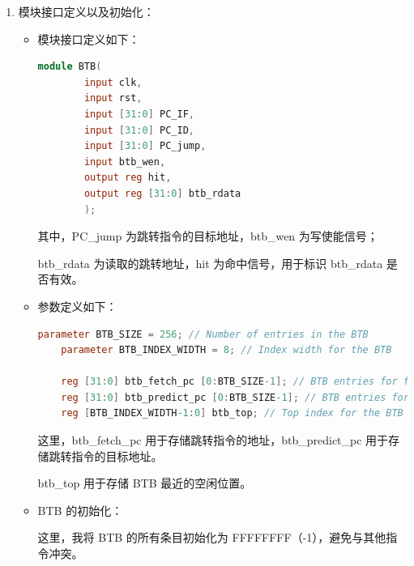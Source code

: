 \documentclass{article}
\begin{document}
\begin{enumerate}
    \item 模块接口定义以及初始化：\par
    \begin{itemize}
        \item 模块接口定义如下：\par
        \begin{lstlisting}[language=Verilog]
    module BTB(
        input clk,
        input rst,
        input [31:0] PC_IF,
        input [31:0] PC_ID,
        input [31:0] PC_jump,
        input btb_wen,
        output reg hit,
        output reg [31:0] btb_rdata
        );
        \end{lstlisting}
        其中，PC\_jump 为跳转指令的目标地址，btb\_wen 为写使能信号；\par
        btb\_rdata 为读取的跳转地址，hit 为命中信号，用于标识 btb\_rdata 是否有效。\par

        \item 参数定义如下：\par
        \begin{lstlisting}[language=Verilog]
    parameter BTB_SIZE = 256; // Number of entries in the BTB
    parameter BTB_INDEX_WIDTH = 8; // Index width for the BTB

    reg [31:0] btb_fetch_pc [0:BTB_SIZE-1]; // BTB entries for fetched PC
    reg [31:0] btb_predict_pc [0:BTB_SIZE-1]; // BTB entries for predicted PC
    reg [BTB_INDEX_WIDTH-1:0] btb_top; // Top index for the BTB
        \end{lstlisting}
        这里，btb\_fetch\_pc 用于存储跳转指令的地址，btb\_predict\_pc 用于存储跳转指令的目标地址。\par
        btb\_top 用于存储 BTB 最近的空闲位置。\par

        \item BTB 的初始化：\par
        这里，我将 BTB 的所有条目初始化为 FFFFFFFF（-1），避免与其他指令冲突。\par

    \end{itemize}


\end{enumerate}
\end{document}
